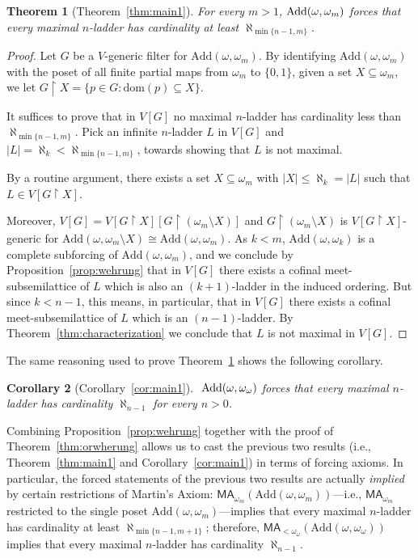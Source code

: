 \documentclass[]{amsart}
\newtheorem{theorem}{Theorem}[section]
\newtheorem{corollary}[theorem]{Corollary}
\theoremstyle{definition}
\theoremstyle{remark}
\begin{document}
\begin{theorem}[Theorem~\ref{thm:main1}]\label{thm:wehrung}
For every $m > 1$, $\text{\upshape Add}(\omega, \omega_{m})$ forces that every maximal $n$-ladder has cardinality at least $\aleph_{\min\{n-1, m\}}$. 
\end{theorem}
\begin{proof}
Let $G$ be a $V$-generic filter for $\text{Add}(\omega, \omega_{m})$. By identifying $\text{Add}(\omega, \omega_{m})$ with the poset of all finite partial maps from $\omega_{m}$ to $\{0,1\}$, given a set $X\subseteq \omega_{m}$, we let $G \upharpoonright X = \{p \in G : \mathrm{dom}(p) \subseteq X\}$.

It suffices to prove that in $V[G]$ no maximal $n$-ladder has cardinality less than $\aleph_{\min\{n-1, m\}}$. Pick an infinite $n$-ladder $L$ in $V[G]$ and $|L| = \aleph_k < \aleph_{\min\{n-1, m\}}$, towards showing that $L$ is not maximal.  

By a routine argument, there exists a set $X \subseteq \omega_{m}$ with $|X| \le \aleph_k = |L|$ such that $L \in V[G \upharpoonright X]$.


 Moreover, $V[G] = V[G \upharpoonright X][G \upharpoonright (\omega_{m} \setminus X)]$ and $G \upharpoonright (\omega_{m} \setminus X)$ is $V[G \upharpoonright X]$-generic for $\text{Add}(\omega,\omega_{m} \setminus X) \cong \text{Add}(\omega,\omega_{m})$. As $k < m$, $\text{Add}(\omega, \omega_k)$ is a complete subforcing of $\text{Add}(\omega,\omega_{m})$, and we conclude by Proposition~\ref{prop:wehrung} that in $V[G]$ there exists a cofinal meet-subsemilattice of $L$ which is also an $(k+1)$-ladder in the induced ordering. But since $k < n-1$, this means, in particular, that in $V[G]$ there exists a cofinal meet-subsemilattice of $L$ which is an $(n-1)$-ladder. By Theorem~\ref{thm:characterization} we conclude that $L$ is not maximal in $V[G]$.
\end{proof}

The same reasoning used to prove Theorem~\ref{thm:wehrung} shows the following corollary.
\begin{corollary}[Corollary~\ref{cor:main1}]
$\text{ \upshape Add}(\omega, \omega_\omega)$ forces that every maximal $n$-ladder has cardinality $\aleph_{n-1}$ for every $n > 0$.
\end{corollary}

Combining Proposition~\ref{prop:wehrung} together with the proof of Theorem~\ref{thm:orwherung} allows us to cast the previous two results (i.e., Theorem~\ref{thm:main1} and Corollary~\ref{cor:main1}) in terms of forcing axioms. In particular, the forced statements of the previous two results are actually \emph{implied} by certain restrictions of Martin's Axiom: $\mathsf{MA}_{\omega_{m}}(\text{Add}(\omega, \omega_{m}))$---i.e., $\mathsf{MA}_{\omega_m}$ restricted to the single poset $\text{Add}(\omega, \omega_{m})$---implies that every maximal $n$-ladder has cardinality at least $\aleph_{\min\{n-1,m+1\}}$; therefore, $\mathsf{MA}_{<\omega_\omega}(\text{Add}(\omega, \omega_{\omega}))$ implies that every maximal $n$-ladder has cardinality $\aleph_{n-1}$. 
\end{document}
